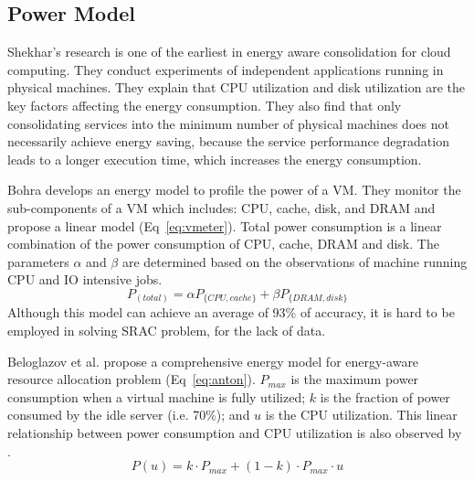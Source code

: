 
\subsection{Power Model}

Shekhar's research \cite{Energy_1} is one of the earliest in energy aware consolidation for cloud computing. They conduct experiments of independent applications running in physical machines. They explain that CPU utilization and disk utilization are the key factors affecting the energy consumption. They also find that only consolidating services into the minimum number of physical machines does not necessarily achieve energy saving, because the service performance degradation leads to a longer execution time, which increases the energy consumption. 

Bohra \cite{Energy_3} develops an energy model to profile the power of a VM. They monitor the sub-components of a VM which includes: CPU, cache, disk, and DRAM and propose a linear model (Eq~\ref{eq:vmeter}). 
Total power consumption is a linear combination of the power consumption of CPU, cache, DRAM and disk. The parameters
$\alpha$ and $\beta$ are determined based on the observations of machine running CPU and IO intensive jobs. 
\begin{equation}
\label{eq:vmeter}
  P_{(total)} = \alpha P_{\{CPU, cache\}} + \beta P_{\{DRAM, disk\}}
\end{equation}
Although this model can achieve an average of 93\% of accuracy, it is hard to be employed in solving SRAC problem, for the lack of data.

Beloglazov et al. \cite{Energy_Service_2} propose a comprehensive energy model for energy-aware resource allocation problem (Eq~\ref{eq:anton}). $P_{max}$ is the maximum power consumption when a virtual machine is fully utilized;
$k$ is the fraction of power consumed by the idle server (i.e. 70\%); and $u$ is the CPU utilization. This linear relationship between power consumption and CPU utilization is also observed by \cite{Energy_4, Energy_5}. 
\begin{equation}
\label{eq:anton}
  P(u) = k \cdot P_{max} + (1 - k) \cdot P_{max} \cdot u
\end{equation}


